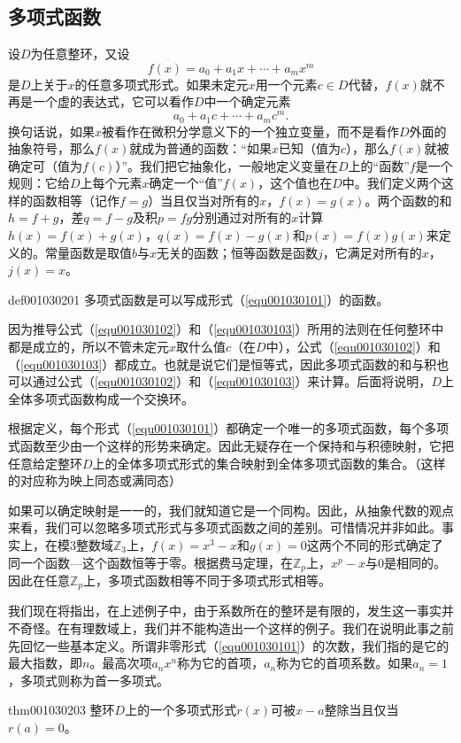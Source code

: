 \subsection{多项式函数}\label{subsection0010302}
设$D$为任意整环，又设
\[
f(x)=a_0+a_1x+\cdots+a_mx^m
\]
是$D$上关于$x$的任意多项式形式。如果未定元$x$用一个元素$c \in D$代替，$f(x)$就不再是一个虚的表达式，它可以看作$D$中一个确定元素
\[
a_0+a_1c+\cdots+a_mc^m.
\] 
换句话说，如果$x$被看作在微积分学意义下的一个独立变量，而不是看作$D$外面的抽象符号，那么$f(x)$就成为普通的函数：“如果$x$已知（值为$c$），那么$f(x)$就被确定可（值为$f(c)$）”。我们把它抽象化，一般地定义变量在$D$上的“函数”$f$是一个规则：它给$D$上每个元素$x$确定一个“值”$f(x)$，这个值也在$D$中。我们定义两个这样的函数相等（记作$f=g$）当且仅当对所有的$x$，$f(x)=g(x)$。两个函数的和$h=f+g$，差$q=f-g$及积$p=fg$分别通过对所有的$x$计算$h(x) = f(x)+g(x)$，$q(x)=f(x)-g(x)$和$p(x)=f(x)g(x)$来定义的。常量函数是取值$b$与$x$无关的函数；恒等函数是函数$j$，它满足对所有的$x$，$j(x)=x$。
\begin{definition}{}{def001030201}
多项式函数是可以写成形式（\ref{equ001030101}）的函数。
\end{definition}

因为推导公式（\ref{equ001030102}）和（\ref{equ001030103}）所用的法则在任何整环中都是成立的，所以不管未定元$x$取什么值$c$（在$D$中），公式（\ref{equ001030102}）和（\ref{equ001030103}）都成立。也就是说它们是恒等式，因此多项式函数的和与积也可以通过公式（\ref{equ001030102}）和（\ref{equ001030103}）来计算。后面将说明，$D$上全体多项式函数构成一个交换环。

根据定义，每个形式（\ref{equ001030101}）都确定一个唯一的多项式函数，每个多项式函数至少由一个这样的形势来确定。因此无疑存在一个保持和与积德映射，它把任意给定整环$D$上的全体多项式形式的集合映射到全体多项式函数的集合。（这样的对应称为映上同态或满同态）

如果可以确定映射是一一的，我们就知道它是一个同构。因此，从抽象代数的观点来看，我们可以忽略多项式形式与多项式函数之间的差别。可惜情况并非如此。事实上，在模3整数域$\mathbb{Z}_3$上，$f(x)=x^3-x$和$g(x)=0$这两个不同的形式确定了同一个函数---这个函数恒等于零。根据费马定理，在$\mathbb{Z}_p$上，$x^p-x$与0是相同的。因此在任意$\mathbb{Z}_p$上，多项式函数相等不同于多项式形式相等。

我们现在将指出，在上述例子中，由于系数所在的整环是有限的，发生这一事实并不奇怪。在有理数域上，我们并不能构造出一个这样的例子。我们在说明此事之前先回忆一些基本定义。所谓非零形式（\ref{equ001030101}）的次数，我们指的是它的最大指数，即$n$。最高次项$a_nx^n$称为它的首项，$a_n$称为它的首项系数。如果$a_n=1$，多项式则称为首一多项式。
\begin{theorem}{}{thm001030203}
整环$D$上的一个多项式形式$r(x)$可被$x-a$整除当且仅当$r(a)=0$。
\end{theorem}


